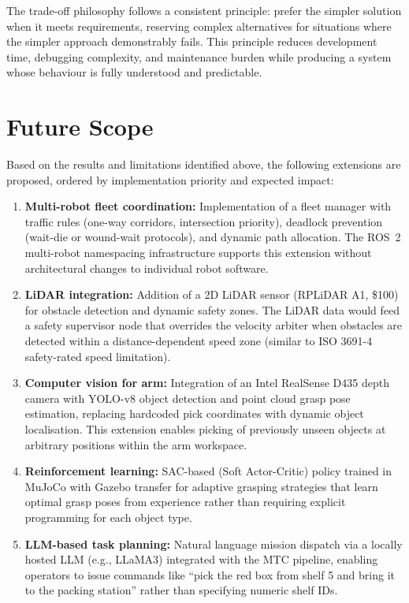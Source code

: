 \documentclass[12pt,a4paper,oneside]{report}
\begin{document}
The trade-off philosophy follows a consistent principle: prefer the simpler solution when it meets requirements, reserving complex alternatives for situations where the simpler approach demonstrably fails. This principle reduces development time, debugging complexity, and maintenance burden while producing a system whose behaviour is fully understood and predictable.

\section{Future Scope}

Based on the results and limitations identified above, the following extensions are proposed, ordered by implementation priority and expected impact:

\begin{enumerate}
\item \textbf{Multi-robot fleet coordination:} Implementation of a fleet manager with traffic rules (one-way corridors, intersection priority), deadlock prevention (wait-die or wound-wait protocols), and dynamic path allocation. The ROS~2 multi-robot namespacing infrastructure supports this extension without architectural changes to individual robot software.

\item \textbf{LiDAR integration:} Addition of a 2D LiDAR sensor (RPLiDAR A1, \$100) for obstacle detection and dynamic safety zones. The LiDAR data would feed a safety supervisor node that overrides the velocity arbiter when obstacles are detected within a distance-dependent speed zone (similar to ISO 3691-4 safety-rated speed limitation).

\item \textbf{Computer vision for arm:} Integration of an Intel RealSense D435 depth camera with YOLO-v8 object detection and point cloud grasp pose estimation, replacing hardcoded pick coordinates with dynamic object localisation. This extension enables picking of previously unseen objects at arbitrary positions within the arm workspace.

\item \textbf{Reinforcement learning:} SAC-based (Soft Actor-Critic) policy trained in MuJoCo with Gazebo transfer for adaptive grasping strategies that learn optimal grasp poses from experience rather than requiring explicit programming for each object type.

\item \textbf{LLM-based task planning:} Natural language mission dispatch via a locally hosted LLM (e.g., LLaMA3) integrated with the MTC pipeline, enabling operators to issue commands like ``pick the red box from shelf 5 and bring it to the packing station'' rather than specifying numeric shelf IDs.


\end{enumerate}
\end{document}
